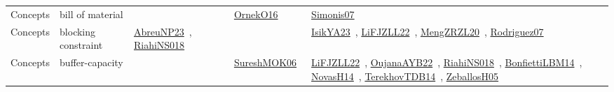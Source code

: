 {\begin{longtable}{lp{3cm}>{\raggedright\arraybackslash}p{6cm}>{\raggedright\arraybackslash}p{6cm}>{\raggedright\arraybackslash}p{8cm}}
Concepts & bill of material &  & \href{../works/OrnekO16.pdf}{OrnekO16}~\cite{OrnekO16} & \href{../works/Simonis07.pdf}{Simonis07}~\cite{Simonis07}\\
Concepts & blocking constraint & \href{../works/AbreuNP23.pdf}{AbreuNP23}~\cite{AbreuNP23}, \href{../works/RiahiNS018.pdf}{RiahiNS018}~\cite{RiahiNS018} &  & \href{../works/IsikYA23.pdf}{IsikYA23}~\cite{IsikYA23}, \href{../works/LiFJZLL22.pdf}{LiFJZLL22}~\cite{LiFJZLL22}, \href{../works/MengZRZL20.pdf}{MengZRZL20}~\cite{MengZRZL20}, \href{../works/Rodriguez07.pdf}{Rodriguez07}~\cite{Rodriguez07}\\
Concepts & buffer-capacity &  & \href{../works/SureshMOK06.pdf}{SureshMOK06}~\cite{SureshMOK06} & \href{../works/LiFJZLL22.pdf}{LiFJZLL22}~\cite{LiFJZLL22}, \href{../works/OujanaAYB22.pdf}{OujanaAYB22}~\cite{OujanaAYB22}, \href{../works/RiahiNS018.pdf}{RiahiNS018}~\cite{RiahiNS018}, \href{../works/BonfiettiLBM14.pdf}{BonfiettiLBM14}~\cite{BonfiettiLBM14}, \href{../works/NovasH14.pdf}{NovasH14}~\cite{NovasH14}, \href{../works/TerekhovTDB14.pdf}{TerekhovTDB14}~\cite{TerekhovTDB14}, \href{../works/ZeballosH05.pdf}{ZeballosH05}~\cite{ZeballosH05}\\

\end{longtable}}
